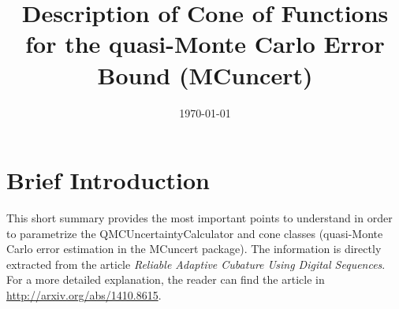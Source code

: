 \documentclass{article}
\newcommand{\N}{\mathbb{N}} %
\newcommand{\bsz}{\boldsymbol{z}}    %
\begin{document}
\newcommand{\bsi}{\boldsymbol{i}}    %
\newcommand{\bsk}{\boldsymbol{k}}    %
\newcommand{\bsl}{\boldsymbol{l}}    %
\newcommand{\bsr}{\boldsymbol{r}}    %
\newcommand{\bsnu}{\boldsymbol{\nu}}    %
\newcommand{\cc}{\mathcal{C}}
\newcommand{\cl}{\mathcal{L}}
\newcommand{\cn}{\mathcal{N}}
\newcommand{\Order}{\mathcal{O}}
\newcommand{\cp}{\mathcal{P}}
\newcommand{\cx}{\mathcal{X}}
\newcommand{\natm}{\N_{0,m}}
\newcommand{\cube}{[0,1)^d}
\newcommand{\hf}{\hat{f}}
\newcommand{\rf}{\mathring{f}}
\newcommand{\tf}{\tilde{f}}
\newcommand{\hg}{\hat{g}}
\newcommand{\hI}{\hat{I}}
\newcommand{\tvk}{\tilde{\bsk}}
\newcommand{\hS}{\widehat{S}}
\newcommand{\tS}{\widetilde{S}}
\newcommand{\wcS}{\widecheck{S}}
\newcommand{\rnu}{\mathring{\nu}}
\newcommand{\tnu}{\widetilde{\nu}}
\newcommand{\hnu}{\widehat{\nu}}
\newcommand{\homega}{\widehat{\omega}}
\newcommand{\wcomega}{\mathring{\omega}}
\newcommand{\fC}{\mathfrak{C}}
\newcommand{\nodes}{\{\bsz_i\}_{i=0}^{\infty}}
\newcommand{\nodesn}{\{\bsz_i\}_{i=0}^{n-1}}
\newcommand{\norm}[1]{\ensuremath{\left \lVert #1 \right \rVert}} \newcommand{\bigabs}[1]{\ensuremath{\bigl \lvert #1 \bigr \rvert}}
\newcommand{\Bigabs}[1]{\ensuremath{\Bigl \lvert #1 \Bigr \rvert}}
\newcommand{\biggabs}[1]{\ensuremath{\biggl \lvert #1 \biggr \rvert}}
\newcommand{\Biggabs}[1]{\ensuremath{\Biggl \lvert #1 \Biggr \rvert}}
\newcommand{\ip}[3][{}]{\ensuremath{\left \langle #2, #3 \right \rangle_{#1}}}

\allowdisplaybreaks


\title{Description of Cone of Functions for the quasi-Monte Carlo Error Bound (MCuncert)}
\date{\today}

\maketitle

\section{Brief Introduction}

This short summary provides the most important points to understand in order to parametrize the QMCUncertaintyCalculator and cone classes (quasi-Monte Carlo error estimation in the MCuncert package). The information is directly extracted from the article \textit{Reliable Adaptive Cubature Using Digital Sequences}. For a more detailed explanation, the reader can find the article in \url{http://arxiv.org/abs/1410.8615}.
\end{document}
